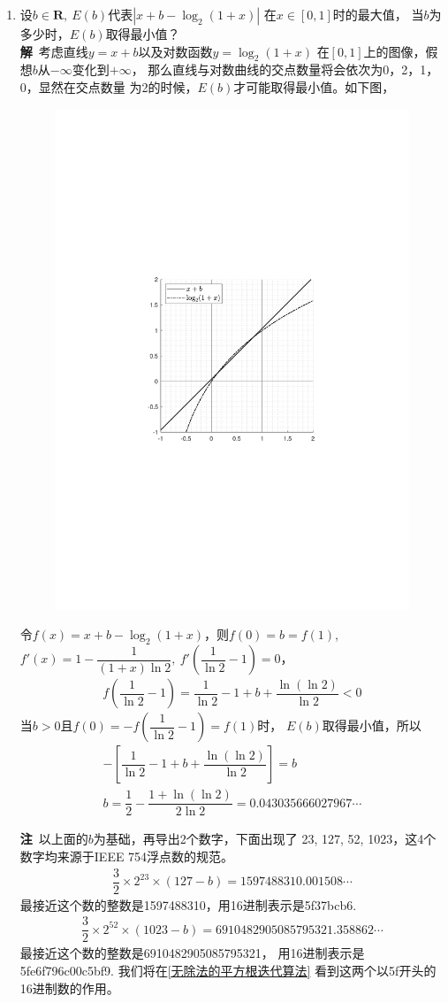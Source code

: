 \begin{enumerate}[label={【\textbf{例\thechapter.\arabic*}】},
 leftmargin=\inteval{\myenumleftmargin}pt,
 itemsep=\inteval{\myenumitempsep}pt,
 itemindent=\inteval{\myenumitemindent}pt]
\item\label{魔术数0x5f3759df}  
设$ b\in \textbf{R},\ E(b) $代表$ |x+b-\log_2(1+x)| $
在$ x\in[0,1] $时的最大值，
当$ b $为多少时，$ E(b) $取得最小值？\\
\textbf{解}\ 考虑直线$ y=x+b $以及对数函数$ y=\log_2(1+x) $
在$ [0,1] $上的图像，假想$ b $从$ -\infty $变化到$ +\infty $，
那么直线与对数曲线的交点数量将会依次为0，2，1，0，显然在交点数量
为2的时候，$ E(b) $才可能取得最小值。如下图，
\begin{figure}[h]
    \centering
    \includegraphics[width=0.5\linewidth]{PDF_Picture/x+b-log2(1+x)最大最小值}
\end{figure}
令$ f(x)=x+b-\log_2(1+x) $，则$ f(0)=b=f(1) $,
$ f'(x)=1-\dfrac{1}{(1+x)\ln2},\ f'\left(\dfrac{1}{\ln2}-1
\right)=0 $，
\begin{gather*}
    f\left(\dfrac{1}{\ln2}-1\right)=
    \dfrac{1}{\ln2}-1+b+\dfrac{\ln(\ln2)}{\ln2}<0
\end{gather*}
当$ b>0 $且$ f(0)=-f\left(\dfrac{1}{\ln2}-1\right)=f(1) $时，
$ E(b) $取得最小值，所以
\begin{gather*}
    -\left[\dfrac{1}{\ln2}-1+b+\dfrac{\ln(\ln2)}{\ln2}\right]=b\\
    b=\dfrac{1}{2}-\dfrac{1+\ln(\ln2)}{2\ln2}=0.043035666027967\cdots
\end{gather*}

\textbf{注}\ 以上面的$ b $为基础，再导出2个数字，下面出现了
23, 127, 52, 1023，这4个数字均来源于IEEE 754浮点数的规范。
\begin{gather*}
    \dfrac{3}{2}\times 2^{23}\times(127-b)=
    1597488310.001508\cdots
\end{gather*} 
最接近这个数的整数是1597488310，用16进制表示是5f37bcb6.
\begin{gather*}                
    \dfrac{3}{2}\times 2^{52}\times(1023-b)=
    6910482905085795321.358862\cdots              
\end{gather*}
最接近这个数的整数是6910482905085795321，
用16进制表示是5fe6f796c00c5bf9. 
我们将在\ref{无除法的平方根迭代算法}
看到这两个以5f开头的16进制数的作用。


\end{enumerate}
